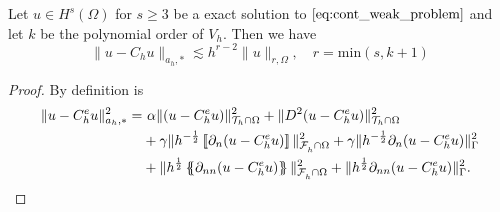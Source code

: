 \begin{lemma}
    \label{lemma:astar_estimate}
    Let $u \in H^{s}( \Omega ) $ for $s\ge 3$ be a exact solution to $\eqref{eq:cont_weak_problem} $ and let $k$ be the polynomial order of $V_{h}$. Then we have
    \begin{equation}
    \|  u - C_{h}u \|_{ a_{h},*  }^{  } \lesssim h^{r-2} \| u \|_{ r, \Omega  }^{  }, \quad r = \mathrm{min} ( s, k+1)
    \end{equation}
\end{lemma}
\begin{proof}
    By definition is
    \begin{equation}
        \begin{split}
            \| u - C_{h}^{e}u \|_{ a_{h}, * }^{  2}  =& \ \alpha  \|  ( u - C_{h}^{e}u) \|_{ \mathcal{T} _{h} \cap \Omega  }^{ 2}  + \| D^2 ( u - C_{h}^{e}u ) \|_{\mathcal{T} _{h} \cap \Omega   }^{ 2 } \\  &  + \gamma \| h^{-\frac{1}{2}} \jump{ \partial _{n} (u -
        C_{h}^{e} u) }   \|_{ \mathcal{F}_{h}^{}\cap \Omega    }^{ 2
        } + \gamma \| h^{-\frac{1}{2}}  \partial _{n} (u - C_{h}^{e}u)    \|_{ \Gamma   }^{ 2 } \\
          & + \| h^{\frac{1}{2}} \mean{ \partial _{nn} (u - C_{h}^{e}u) }   \|_{\mathcal{F} _{h}^{} \cap \Omega   }^{  2} +  \| h^{\frac{1}{2}} \partial _{nn}(u - C_{h}^{e}u)     \|_{ \Gamma }^{  2}.
        \end{split}
    \end{equation}


\end{proof}
